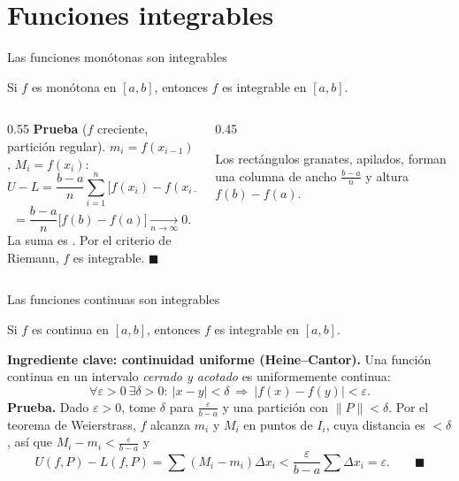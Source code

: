 \documentclass[10pt,aspectratio=169]{beamer}
\begin{document}
\section{Funciones integrables}

\begin{frame}{Las funciones monótonas son integrables}
  \begin{teorema}
    Si $f$ es monótona en $[a,b]$, entonces $f$ es integrable en $[a,b]$.
  \end{teorema}
  \begin{columns}
    \begin{column}{0.55\textwidth}
      \textbf{Prueba} ($f$ creciente, partición regular). $m_i=f(x_{i-1})$, $M_i=f(x_i)$:
      \[ U-L=\frac{b-a}{n}\sum_{i=1}^n\big[f(x_i)-f(x_{i-1})\big] \]
      \[ =\frac{b-a}{n}\big[f(b)-f(a)\big]\xrightarrow[n\to\infty]{}0. \]
      La suma es . Por el criterio de Riemann, $f$ es integrable. $\blacksquare$
    \end{column}
    \begin{column}{0.45\textwidth}
      \centering

      \small Los rectángulos granates, apilados, forman una columna de ancho $\frac{b-a}{n}$ y
      altura $f(b)-f(a)$.
    \end{column}
  \end{columns}
\end{frame}

\begin{frame}{Las funciones continuas son integrables}
  \begin{teorema}
    Si $f$ es continua en $[a,b]$, entonces $f$ es integrable en $[a,b]$.
  \end{teorema}
  \textbf{Ingrediente clave: continuidad uniforme (Heine--Cantor).} Una función continua en un intervalo
  \emph{cerrado y acotado} es uniformemente continua:
  \[ \forall\varepsilon>0\ \exists\delta>0:\ |x-y|<\delta\ \Rightarrow\ |f(x)-f(y)|<\varepsilon. \]
  \textbf{Prueba.} Dado $\varepsilon>0$, tome $\delta$ para $\frac{\varepsilon}{b-a}$ y una partición con $\|P\|<\delta$.
  Por el teorema de Weierstrass, $f$ alcanza $m_i$ y $M_i$ en puntos de $I_i$, cuya distancia es $<\delta$, así que
  $M_i-m_i<\frac{\varepsilon}{b-a}$ y
  \[ U(f,P)-L(f,P)=\sum(M_i-m_i)\Delta x_i<\frac{\varepsilon}{b-a}\sum\Delta x_i=\varepsilon.\qquad\blacksquare \]
\end{frame}
\end{document}
